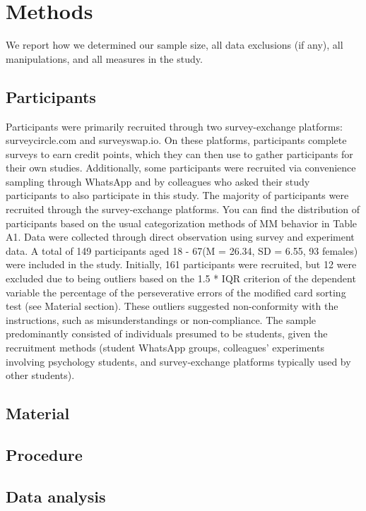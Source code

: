 \documentclass[
  man]{apa7}
\begin{document}
\section{Methods}\label{methods}

We report how we determined our sample size, all data exclusions (if any), all manipulations, and all measures in the study.

\subsection{Participants}\label{participants}

Participants were primarily recruited through two survey-exchange platforms: surveycircle.com and surveyswap.io. On these platforms, participants complete surveys to earn credit points, which they can then use to gather participants for their own studies. Additionally, some participants were recruited via convenience sampling through WhatsApp and by colleagues who asked their study participants to also participate in this study. The majority of participants were recruited through the survey-exchange platforms. You can find the distribution of participants based on the usual categorization methods of MM behavior in Table A1.
Data were collected through direct observation using survey and experiment data. A total of 149 participants aged 18 - 67(M = 26.34, SD = 6.55, 93 females) were included in the study. Initially, 161 participants were recruited, but 12 were excluded due to being outliers based on the 1.5 * IQR criterion of the dependent variable the percentage of the perseverative errors of the modified card sorting test (see Material section). These outliers suggested non-conformity with the instructions, such as misunderstandings or non-compliance. The sample predominantly consisted of individuals presumed to be students, given the recruitment methods (student WhatsApp groups, colleagues' experiments involving psychology students, and survey-exchange platforms typically used by other students).

\subsection{Material}\label{material}

\subsection{Procedure}\label{procedure}

\subsection{Data analysis}\label{data-analysis}
\end{document}
